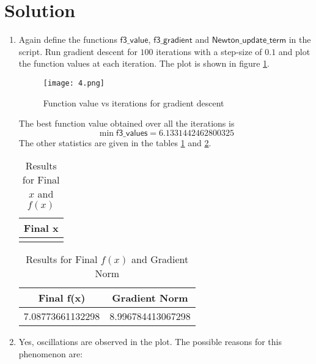 \documentclass[12pt,a4paper]{article}
\theoremstyle{remark}
\begin{document}
\section*{Solution}

\begin{enumerate}
    \item Again define the functions $\mathsf{f3\_value}$, $\mathsf{f3\_gradient}$ and $\mathsf{Newton\_update\_term}$ in the script. Run gradient descent for $100$ iterations with a step-size of $0.1$ and plot the function values at each iteration. The plot is shown in figure \ref{fig:f3_value_vs_iterations}.
    
    \begin{figure}
        \centering
        \texttt{[image: 4.png]}
        \caption{Function value vs iterations for gradient descent}
        \label{fig:f3_value_vs_iterations}
    \end{figure}

    The best function value obtained over all the iterations is $$\min \mathsf{f3\_values} = 6.1331442462800325$$ The other statistics are given in the tables \ref{table:f3_results} and \ref{table:f3_fx_gradient}.

    \begin{table}
        \centering
        \begin{tabular}{|c|}
        \hline
        \textbf{Final x} \\
        \hline
        [-4.79441025e-01, 2.17408789e-17, 2.17408789e-17, 2.17408789e-17, 3.19757550e-05] \\
        \hline
        \end{tabular}
        \caption{Results for Final $x$ and $f(x)$}
        \label{table:f3_results}
    \end{table}

    \begin{table}
        \centering
        \begin{tabular}{|c|c|}
        \hline
        \textbf{Final f(x)} & \textbf{Gradient Norm} \\
        \hline
        7.08773661132298 & 8.996784413067298 \\
        \hline
        \end{tabular}
        \caption{Results for Final $f(x)$ and Gradient Norm}
        \label{table:f3_fx_gradient}
    \end{table}

    \item Yes, oscillations are observed in the plot. The possible reasons for this phenomenon are:
    

\end{enumerate}
\end{document}
